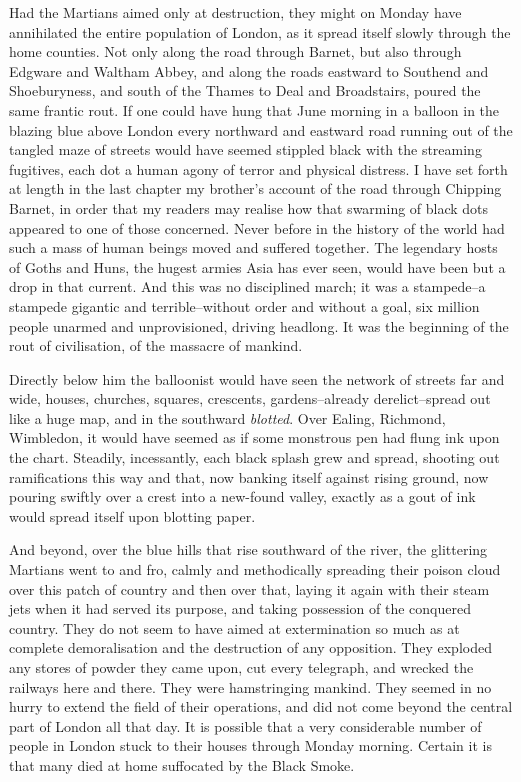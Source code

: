 Had the Martians aimed only at destruction, they might on Monday
have annihilated the entire population of London, as it spread
itself slowly through the home counties. Not only along the road
through Barnet, but also through Edgware and Waltham Abbey, and
along the roads eastward to Southend and Shoeburyness, and south of
the Thames to Deal and Broadstairs, poured the same frantic rout.
If one could have hung that June morning in a balloon in the
blazing blue above London every northward and eastward road running
out of the tangled maze of streets would have seemed stippled black
with the streaming fugitives, each dot a human agony of terror and
physical distress. I have set forth at length in the last chapter
my brother's account of the road through Chipping Barnet, in order
that my readers may realise how that swarming of black dots
appeared to one of those concerned. Never before in the history of
the world had such a mass of human beings moved and suffered
together. The legendary hosts of Goths and Huns, the hugest armies
Asia has ever seen, would have been but a drop in that current. And
this was no disciplined march; it was a stampede--a stampede
gigantic and terrible--without order and without a goal, six
million people unarmed and unprovisioned, driving headlong. It was
the beginning of the rout of civilisation, of the massacre of
mankind.

Directly below him the balloonist would have seen the network of
streets far and wide, houses, churches, squares, crescents,
gardens--already derelict--spread out like a huge map, and in the
southward \emph{blotted}. Over Ealing, Richmond, Wimbledon, it
would have seemed as if some monstrous pen had flung ink upon the
chart. Steadily, incessantly, each black splash grew and spread,
shooting out ramifications this way and that, now banking itself
against rising ground, now pouring swiftly over a crest into a
new-found valley, exactly as a gout of ink would spread itself upon
blotting paper.

And beyond, over the blue hills that rise southward of the river,
the glittering Martians went to and fro, calmly and methodically
spreading their poison cloud over this patch of country and then
over that, laying it again with their steam jets when it had served
its purpose, and taking possession of the conquered country. They
do not seem to have aimed at extermination so much as at complete
demoralisation and the destruction of any opposition. They exploded
any stores of powder they came upon, cut every telegraph, and
wrecked the railways here and there. They were hamstringing
mankind. They seemed in no hurry to extend the field of their
operations, and did not come beyond the central part of London all
that day. It is possible that a very considerable number of people
in London stuck to their houses through Monday morning. Certain it
is that many died at home suffocated by the Black Smoke.

